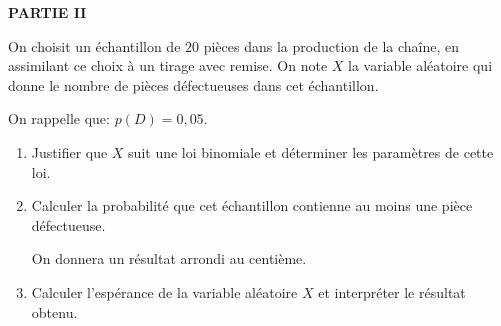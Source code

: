 \documentclass[10pt]{article}
\begin{document}
\textbf{PARTIE II}

\medskip

On choisit un échantillon de $20$ pièces dans la production de la chaîne, en assimilant
ce choix à un tirage avec remise. On note $X $ la variable aléatoire qui donne le nombre
de pièces défectueuses dans cet échantillon.

On rappelle que: $p(D) = 0,05$.

\medskip

\begin{enumerate}
\item  Justifier que $X$ suit une loi binomiale et déterminer les paramètres de cette loi.
\item Calculer la probabilité que cet échantillon contienne au moins une pièce défectueuse.

On donnera un résultat arrondi au centième.
\item Calculer l'espérance de la variable aléatoire $X$ et interpréter le résultat obtenu.

\end{enumerate}

\vspace{0,5cm}
\end{document}

